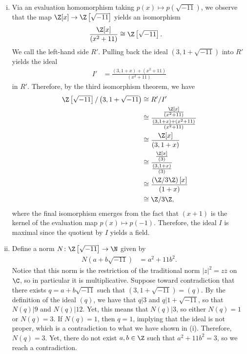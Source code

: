 \documentclass[10pt]{mypackage}
\begin{document}
\begin{solution}\hfill
  \begin{enumerate}[(i)]
    \item Via an evaluation homomorphism taking $p(x) \mapsto p\left(\sqrt{-11}\right)$, we observe that the map $\Z[x]\rightarrow \Z\left[ \sqrt{-11} \right]$ yields an isomorphism
      \begin{align*}
        \frac{\Z[x]}{\left( x^2 + 11 \right)} &\cong \Z\left[ \sqrt{-11} \right].
      \end{align*}
      We call the left-hand side $R'$. Pulling back the ideal $\left( 3,1+\sqrt{-11} \right)$ into $R'$ yields the ideal
      \begin{align*}
        I' &= \frac{\left( 3,1+x \right)+\left( x^2 + 11 \right)}{\left( x^2 + 11 \right)}
      \end{align*}
      in $R'$. Therefore, by the third isomorphism theorem, we have
      \begin{align*}
        \Z\left[ \sqrt{-11} \right]/\left( 3,1+\sqrt{-11} \right) &\cong R'/I'\\
                                                                  &\cong \frac{\frac{\Z[x]}{\left( x^2 + 11 \right)}}{\frac{\left( 3,1+x \right)+ \left( x^2 + 11 \right)}{\left( x^2 + 11 \right)}}\\
                                                                  &\cong \frac{\Z[x]}{\left( 3,1+x \right)}\\
                                                                  &\cong \frac{\frac{\Z[x]}{\left( 3 \right)}}{\frac{\left( 3,1+x \right)}{\left( 3 \right)}}\\
                                                                  &\cong \frac{\left( \Z/3\Z \right)[x]}{\left( 1+x \right)}\\
                                                                  &\cong \Z/3\Z,
      \end{align*}
      where the final isomorphism emerges from the fact that $\left( x+1 \right)$ is the kernel of the evaluation map $p(x)\mapsto p\left(-1\right)$. Therefore, the ideal $I$ is maximal since the quotient by $I$ yields a field.
    \item Define a norm $N\colon \Z\left[ \sqrt{-11} \right] \rightarrow \N$ given by
      \begin{align*}
        N\left( a + b\sqrt{-11} \right) &= a^2 + 11 b^2.
      \end{align*}
      Notice that this norm is the restriction of the traditional norm $\left\vert z \right\vert^2 = z \overline{z}$ on $\C$, so in particular it is multiplicative. Suppose toward contradiction that there exists $q = a + b\sqrt{-11}$ such that $\left( 3,1+\sqrt{-11} \right)= \left( q \right)$. By the definition of the ideal $\left( q \right)$, we have that $q | 3$ and $q | 1 + \sqrt{-11}$, so that $N(q) | 9$ and $N(q) | 12$. Yet, this means that $N(q) | 3$, so either $N(q) = 1$ or $N(q) = 3$. If $N(q) = 1$, then $q = 1$, implying that the ideal is not proper, which is a contradiction to what we have shown in (i). Therefore, $N(q) = 3$. Yet, there do not exist $a,b\in \Z$ such that $a^2 + 11 b^2 = 3$, so we reach a contradiction.

\end{enumerate}
\end{solution}
\end{document}
